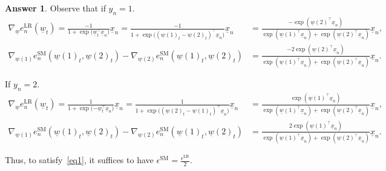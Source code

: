 \documentclass{article}
\theoremstyle{definition}
\newtheorem*{answer}{Answer}
\begin{document}
\begin{question}[start=0]
\begin{question}
\begin{answer}
			Observe that if $y_n=1$.
			\begin{align*}
				 \nabla_{\!\underline{w}}e^{\text{LR}}_{n}(\underline{w}_{t}) = \frac{-1}{1 + \exp{(\underline{w}_{t}^\top \underline{x}_{n}})}\underline{x}_{n}=\frac{-1}{1 + \exp{(\left(\underline{w}(1)_{t} - \underline{w}(2)_{t}\right)^\top \underline{x}_{n}})}\underline{x}_{n} &=\frac{-\exp(\underline{w}(2)^\top\underline{x}_n)}{\exp(\underline{w}(1)^\top\underline{x}_n) + \exp(\underline{w}(2)^\top\underline{x}_n)}\underline{x}_n,\\
				 \nabla_{\!\underline{w}(1)}e^{\text{SM}}_{n}(\underline{w}(1)_{t}, \underline{w}(2)_{t}) -  \nabla_{\!\underline{w}(2)}e^{\text{SM}}_{n}(\underline{w}(1)_{t}, \underline{w}(2)_{t}) &= \frac{-2\exp(\underline{w}(2)^\top\underline{x}_n)}{\exp(\underline{w}(1)^\top\underline{x}_n) + \exp(\underline{w}(2)^\top\underline{x}_n)}\underline{x}_n.
			\end{align*}
			
			If $y_n=2$.
			\begin{align*}
				\nabla_{\!\underline{w}}e^{\text{LR}}_{n}(\underline{w}_{t}) = \frac{1}{1 + \exp{(-\underline{w}_{t}^\top \underline{x}_{n}})}\underline{x}_{n}= \frac{1}{1 + \exp{(\left(\underline{w}(2)_{t} - \underline{w}(1)_{t}\right)^\top \underline{x}_{n}})}\underline{x}_{n} &=\frac{\exp(\underline{w}(1)^\top\underline{x}_n)}{\exp(\underline{w}(1)^\top\underline{x}_n) + \exp(\underline{w}(2)^\top\underline{x}_n)}\underline{x}_n,\\
				\nabla_{\!\underline{w}(1)}e^{\text{SM}}_{n}(\underline{w}(1)_{t}, \underline{w}(2)_{t}) -  \nabla_{\!\underline{w}(2)}e^{\text{SM}}_{n}(\underline{w}(1)_{t}, \underline{w}(2)_{t}) &= \frac{2\exp(\underline{w}(1)^\top\underline{x}_n)}{\exp(\underline{w}(1)^\top\underline{x}_n) + \exp(\underline{w}(2)^\top\underline{x}_n)}\underline{x}_n.
			\end{align*}
			
			Thus, to satisfy~\eqref{eq1}, it suffices to have $\epsilon^{\text{SM}} = \frac{\epsilon^{\text{LR}}}{2}$.
			
		\end{answer}
	\end{question}
\end{question}
\end{document}
